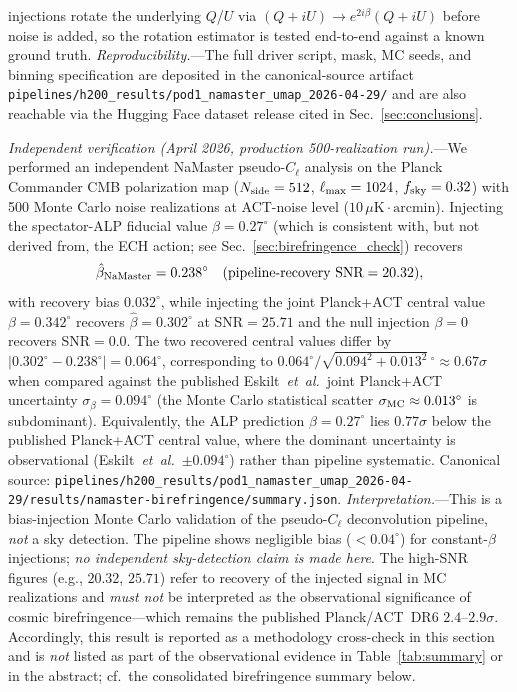 \documentclass[aps,prd,twocolumn,superscriptaddress,showpacs,preprintnumbers,nofootinbib,longbibliography,floatfix]{revtex4-2}
\newcommand{\etal}{\textit{et~al.}}
\begin{document}
injections rotate the underlying $Q$/$U$ via $(Q+iU)\to e^{2i\beta}(Q+iU)$ before noise is added, so the rotation estimator is tested end-to-end against a known ground truth. \emph{Reproducibility.}---The full driver script, mask, MC seeds, and binning specification are deposited in the canonical-source artifact \texttt{pipelines/h200\_results/pod1\_namaster\_umap\_2026-04-29/} and are also reachable via the Hugging Face dataset release cited in Sec.~\ref{sec:conclusions}.

\textit{Independent verification (April 2026, production 500-realization run).}---We performed an independent NaMaster pseudo-$C_\ell$ analysis on the Planck Commander CMB polarization map ($N_{\rm side}=512$, $\ell_{\rm max}=1024$, $f_{\rm sky}=0.32$) with 500 Monte Carlo noise realizations at ACT-noise level ($10\,\mu\mathrm{K\cdot arcmin}$). Injecting the spectator-ALP fiducial value $\beta=0.27^\circ$ (which is consistent with, but not derived from, the ECH action; see Sec.~\ref{sec:birefringence_check}) recovers
\begin{equation}
  \hat\beta_{\rm NaMaster} = 0.238^\circ \quad (\text{pipeline-recovery SNR}=20.32),
  \label{eq:beta_namaster}
\end{equation}
with recovery bias $0.032^\circ$, while injecting the joint Planck+ACT central value $\beta=0.342^\circ$ recovers $\hat\beta = 0.302^\circ$ at SNR$=25.71$ and the null injection $\beta=0$ recovers SNR$=0.0$. The two recovered central values differ by $|0.302^\circ - 0.238^\circ| = 0.064^\circ$, corresponding to $0.064^\circ / \sqrt{0.094^2 + 0.013^2}\,^\circ \approx 0.67\sigma$ when compared against the published Eskilt~\etal\ joint Planck+ACT uncertainty $\sigma_\beta = 0.094^\circ$ (the Monte Carlo statistical scatter $\sigma_{\rm MC} \approx 0.013^\circ$ is subdominant). Equivalently, the ALP prediction $\beta = 0.27^\circ$ lies $0.77\sigma$ below the published Planck+ACT central value, where the dominant uncertainty is observational (Eskilt~\etal\ $\pm 0.094^\circ$) rather than pipeline systematic. Canonical source: \texttt{pipelines/h200\_results/pod1\_namaster\_umap\_2026-04-29/results/namaster-birefringence/summary.json}. \emph{Interpretation.}---This is a bias-injection Monte Carlo validation of the pseudo-$C_\ell$ deconvolution pipeline, \emph{not} a sky detection. The pipeline shows negligible bias ($<0.04^\circ$) for constant-$\beta$ injections; \emph{no independent sky-detection claim is made here}. The high-SNR figures (e.g., $20.32$, $25.71$) refer to recovery of the injected signal in MC realizations and \emph{must not} be interpreted as the observational significance of cosmic birefringence---which remains the published Planck/ACT~DR6 $2.4$--$2.9\sigma$. Accordingly, this result is reported as a methodology cross-check in this section and is \emph{not} listed as part of the observational evidence in Table~\ref{tab:summary} or in the abstract; cf.\ the consolidated birefringence summary below.
\end{document}
